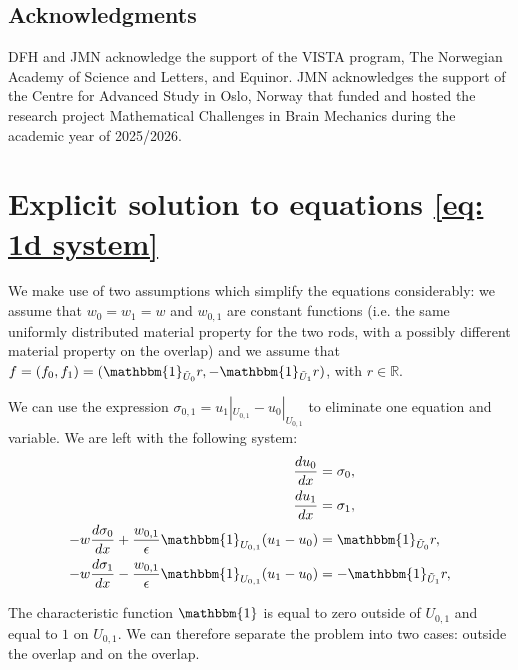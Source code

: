 \documentclass[reqno]{amsart}
\numberwithin{equation}{section}
\theoremstyle{definition}
\newcommand{\R}{\mathbb{R}}
\begin{document}
\subsection*{Acknowledgments}
DFH and JMN acknowledge the support of the VISTA program, The Norwegian Academy of Science and Letters, and Equinor. JMN acknowledges the support of the Centre for Advanced Study in Oslo, Norway that funded and hosted the research project Mathematical Challenges in Brain Mechanics during the academic year of 2025/2026.









\appendix
\section{Explicit solution to  equations \eqref{eq: 1d system}}
\label{appendix}

We make use of two assumptions which simplify the equations considerably: we assume that $w_0 = w_1 = w$ and $w_{0,1}$ are constant functions (i.e. the same uniformly distributed material property for the two rods, with a possibly different material property on the overlap) and we assume that $f=(f_0, f_1) = (\mathbbm{1}_{\Tilde{U}_0}r,-\mathbbm{1}_{\Tilde{U}_1}r)$, with $r \in \R$.

We can use the expression $\sigma_{0,1} = u_1|_{U_{0,1}} - u_0|_{U_{0,1}}$ to eliminate one equation and variable. We are left with the following system:
\begin{subequations}\label{eq: 1d system ODE}
\begin{align} 
\frac{du_0}{dx} &= \sigma_0, \\
\frac{du_1}{dx} &= \sigma_1, \\
-w\frac{d\sigma_{0}}{dx} + \frac{w_{0,1}}{\epsilon} \mathbbm{1}_{U_{0,1}} (u_1 - u_0)  &= \mathbbm{1}_{\Tilde{U}_0} r, \label{eq: 1d system ODE d} \\
-w\frac{d\sigma_{1}}{dx} - \frac{w_{0,1}}{\epsilon} \mathbbm{1}_{U_{0,1}} (u_1 - u_0)  &= -\mathbbm{1}_{\Tilde{U}_1}r  \label{eq: 1d system ODE e},
\end{align}
\end{subequations}

The characteristic function $\mathbbm{1}$ is equal to zero outside of $U_{0,1}$ and equal to $1$ on $U_{0,1}$. We can therefore separate the problem into two cases: outside the overlap and on the overlap.
\end{document}
